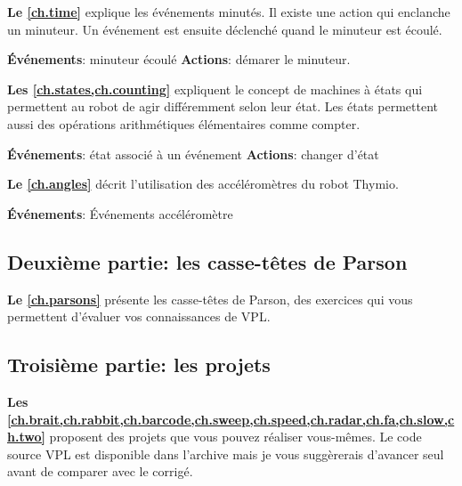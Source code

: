  \quad {} \hfill {}
\quad {} \quad {}

\medskip


\medskip

\textbf{Le \cref{ch.time}} explique les événements minutés.
Il existe une action qui enclanche un minuteur.
Un événement est ensuite déclenché quand le minuteur est écoulé.

\textbf{Événements}: minuteur écoulé\hfill
\textbf{Actions}: démarer le minuteur.

 \hfill {}

\newpage

\textbf{Les \cref{ch.states,ch.counting}} expliquent le concept de machines à états qui permettent au robot de agir différemment selon leur état.
Les états permettent aussi des opérations arithmétiques élémentaires comme compter.

\textbf{Événements}: état associé à un événement\hfill
\textbf{Actions}: changer d'état

 \hfill {}

\medskip

\textbf{Le \cref{ch.angles}} décrit l'utilisation des accéléromètres du robot Thymio.

\textbf{Événements}: Événements accéléromètre

 \quad {}

\bigskip

\subsection*{Deuxième partie: les casse-têtes de Parson}

\textbf{Le \cref{ch.parsons}} présente les casse-têtes de Parson, des exercices qui vous permettent d'évaluer vos connaissances de VPL.

\bigskip

\subsection*{Troisième partie: les projets}
\textbf{Les \cref{ch.brait,ch.rabbit,ch.barcode,ch.sweep,ch.speed,ch.radar,ch.fa,ch.slow,ch.two}} proposent des projets que vous pouvez réaliser vous-mêmes.
Le code source VPL est disponible dans l'archive mais je vous suggèrerais d'avancer seul avant de comparer avec le corrigé.

